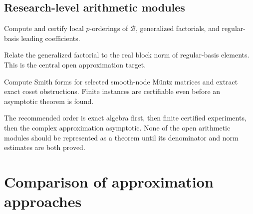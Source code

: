 \documentclass[11pt,oneside]{article}
\theoremstyle{definition}
\theoremstyle{remark}
\newcommand{\Bsem}{\mathcal B}
\begin{document}
\subsection{Research-level arithmetic modules}

\begin{description}[style=nextline]
\item[\texttt{SmoothSemigroupPOrdering}]
Compute and certify local $p$-orderings of $\Bsem$, generalized factorials, and regular-basis
leading coefficients.

\item[\texttt{AdelicBlockNorm}]
Relate the generalized factorial to the real block norm of regular-basis elements.  This is
the central open approximation target.

\item[\texttt{EvaluationLatticeSmith}]
Compute Smith forms for selected smooth-node M\"untz matrices and extract exact coset
obstructions.  Finite instances are certifiable even before an asymptotic theorem is found.
\end{description}

The recommended order is exact algebra first, then finite certified experiments, then the
complex approximation asymptotic.  None of the open arithmetic modules should be represented
as a theorem until its denominator and norm estimates are both proved.


\section{Comparison of approximation approaches}
\label{sec:comparison}
\end{document}

